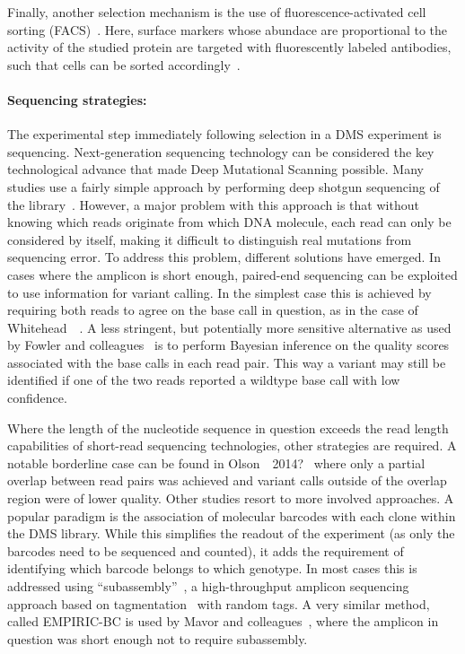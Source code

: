 Finally, another selection mechanism is the use of fluorescence-activated cell sorting (FACS)~. Here, surface markers whose abundace are proportional to the activity of the studied protein are targeted with fluorescently labeled antibodies, such that cells can be sorted accordingly~\cite{schlinkmann_critical_2012,majithia_2016}.


\paragraph{Sequencing strategies:} The experimental step immediately following selection in a DMS experiment is sequencing. Next-generation sequencing technology can be considered the key technological advance that made Deep Mutational Scanning possible. Many studies use a fairly simple approach by performing deep shotgun sequencing of the library~\cite{ernst_coevolution_2010,hietpas_experimental_2011,fujino_robust_2012}. However, a major problem with this approach is that without knowing which reads originate from which DNA molecule, each read can only be considered by itself, making it difficult to distinguish real mutations from sequencing error. To address this problem, different solutions have emerged. In cases where the amplicon is short enough, paired-end sequencing can be exploited to use information for variant calling. In the simplest case this is achieved by requiring both reads to agree on the base call in question, as in the case of Whitehead~\etal~\cite{whitehead_optimization_2012}. A less stringent, but potentially more sensitive alternative as used by Fowler and colleagues~\cite{fowler_high-resolution_2010} is to perform Bayesian inference on the quality scores associated with the base calls in each read pair. This way a variant may still be identified if one of the two reads reported a wildtype base call with low confidence. 

Where the length of the nucleotide sequence in question exceeds the read length capabilities of short-read sequencing technologies, other strategies are required. A notable borderline case can be found in Olson~\etal~2014?~\cite{olson_comprehensive_2014} where only a partial overlap between read pairs was achieved and variant calls outside of the overlap region were of lower quality. Other studies resort to more involved approaches. A popular paradigm is the association of molecular barcodes with each clone within the DMS library. While this simplifies the readout of the experiment (as only the barcodes need to be sequenced and counted), it adds the requirement of identifying which barcode belongs to which genotype. In most cases this is addressed using ``subassembly''~\cite{hiatt_parallel_2010}, a high-throughput amplicon sequencing approach based on tagmentation~\cite{tagmentation} with random tags.  
A very similar method, called EMPIRIC-BC is used by Mavor and colleagues~\cite{mavor_determination_2016}, where the amplicon in question was short enough not to require subassembly.

